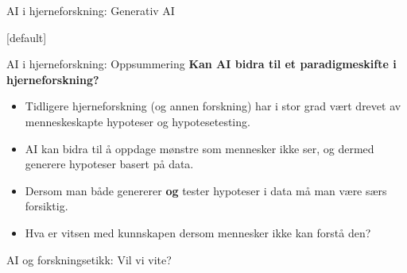 \documentclass[8pt]{beamer}
\begin{document}
	\begin{frame}{AI i hjerneforskning: Generativ AI}
		\centering
	\end{frame}

	[default]

	\begin{frame}{AI i hjerneforskning: Oppsummering}
		\textbf{Kan AI bidra til et paradigmeskifte i hjerneforskning?}
		\begin{itemize}
			\item Tidligere hjerneforskning (og annen forskning) har i stor grad vært drevet av menneskeskapte hypoteser og hypotesetesting.
			\item AI kan bidra til å oppdage mønstre som mennesker ikke ser, og dermed generere hypoteser basert på data.
			\item Dersom man både genererer \textbf{og} tester hypoteser i data må man være særs forsiktig.
			\item Hva er vitsen med kunnskapen dersom mennesker ikke kan forstå den?
		\end{itemize}
	\end{frame}

	\begin{frame}{AI og forskningsetikk: Vil vi vite?}
		\centering
	\end{frame}
\end{document}
